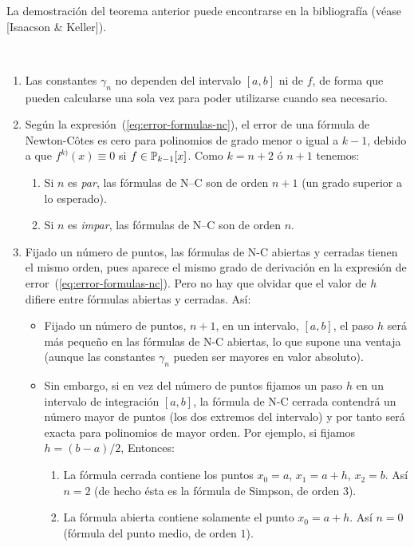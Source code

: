 La demostración del teorema anterior puede encontrarse en la
bibliografía (véase [Isaacson \& Keller]).%

\begin{remark}~
  \label{rk:7}
  \begin{enumerate}
  \item Las constantes $\gamma_n$ no dependen del intervalo $[a,b]$ ni
    de $f$, de forma que pueden calcularse una sola vez para poder
    utilizarse cuando sea necesario.
  \item Según la expresión~(\ref{eq:error-formulas-nc}), el error de
    una fórmula de Newton-Côtes es cero para polinomios de grado menor
    o igual a $k-1$, debido a que $f^{k)}(x)\equiv 0$ si
    $f\in\operatorname{{\mathbb P}}_{k-1}[x]$. Como $k=n+2$ ó $n+1$ tenemos:
    \begin{enumerate}
    \item Si $n$ es \textit{par}, las fórmulas de N--C son de
      orden $n+1$ (un grado superior a lo esperado).
    \item Si $n$ es \textit{impar}, las fórmulas de N--C son de
      orden $n$.
    \end{enumerate}
  \item Fijado un número de puntos, las fórmulas de N-C abiertas y
    cerradas tienen el mismo orden, pues aparece el mismo grado de
    derivación en la expresión de
    error~(\ref{eq:error-formulas-nc}). Pero no hay que olvidar que el
    valor de $h$ difiere entre fórmulas abiertas y cerradas. Así:
    \begin{itemize}
    \item Fijado un número de puntos, $n+1$, en un intervalo,
      $[a,b]$, el paso $h$ será más pequeño en las fórmulas de N-C
      abiertas, lo que supone una ventaja (aunque las constantes
      $\gamma_n$ pueden ser mayores en valor absoluto).
    \item Sin embargo, si en vez del número de puntos fijamos un paso
      $h$ en un intervalo de integración $[a,b]$, la fórmula de N-C
      cerrada contendrá un número mayor de puntos (los dos extremos
      del intervalo) y por tanto será exacta para polinomios de mayor
      orden. Por ejemplo, si fijamos $h=(b-a)/2$, Entonces:
      \begin{enumerate}
      \item La fórmula cerrada contiene los puntos $x_0=a$, $x_1=a+h$,
        $x_2=b$. Así $n=2$ (de hecho ésta es la fórmula de Simpson, de
        orden $3$).
      \item La fórmula abierta contiene solamente el punto $x_0=a+h$.
        Así $n=0$ (fórmula del punto medio, de orden $1$).
      \end{enumerate}
    \end{itemize}


\end{enumerate}
\end{remark}
